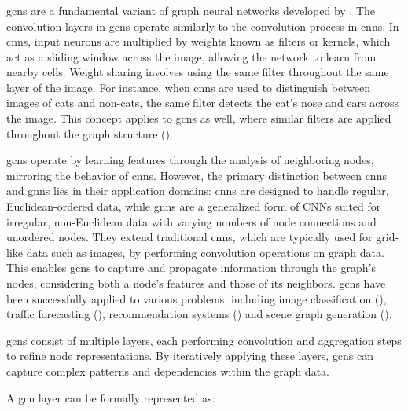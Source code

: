 \subsubsection*{}

\glspl{gcn} are a fundamental variant of graph neural networks developed by \cite{Kipf2017}.
The convolution layers in \glspl{gcn} operate similarly to the convolution process in \glspl{cnn}.
In \glspl{cnn}, input neurons are multiplied by weights known as filters or kernels, which act as a sliding window across the image, allowing the network to learn from nearby cells.
Weight sharing involves using the same filter throughout the same layer of the image.
For instance, when \glspl{cnn} are used to distinguish between images of cats and non-cats, the same filter detects the cat's nose and ears across the image.
This concept applies to \glspl{gcn} as well, where similar filters are applied throughout the graph structure (\cite{Kipf2017}).

\glspl{gcn} operate by learning features through the analysis of neighboring nodes, mirroring the behavior of \glspl{cnn}.
However, the primary distinction between \glspl{cnn} and \glspl{gnn} lies in their application domains: \glspl{cnn} are designed to handle regular, Euclidean-ordered data, while \glspl{gnn} are a generalized form of CNNs suited for irregular, non-Euclidean data with varying numbers of node connections and unordered nodes.
They extend traditional \glspl{cnn}, which are typically used for grid-like data such as images, by performing convolution operations on graph data.
This enables \glspl{gcn} to capture and propagate information through the graph's nodes, considering both a node's features and those of its neighbors.
\glspl{gcn} have been successfully applied to various problems, including image classification (\cite{Monti2016}), traffic forecasting (\cite{Cui2020}), recommendation systems (\cite{Fan2019}) and scene graph generation (\cite{Yang_2018_ECCV}).

\glspl{gcn} consist of multiple layers, each performing convolution and aggregation steps to refine node representations.
By iteratively applying these layers, \glspl{gcn} can capture complex patterns and dependencies within the graph data.

A \gls{gcn} layer can be formally represented as:

